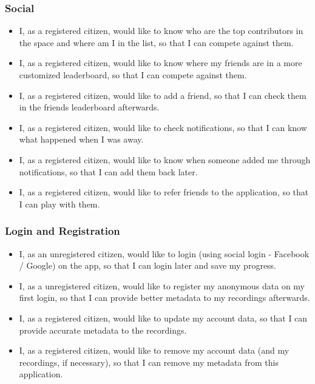 \subsubsection{Social}

\begin{itemize}
    \item I, as a registered citizen, would like to know who are the top contributors in the space and where am I in the list, so that I can compete against them.
    \item I, as a registered citizen, would like to know where my friends are in a more customized leaderboard, so that I can compete against them.
    \item I, as a registered citizen, would like to add a friend, so that I can check them in the friends leaderboard afterwards.
    \item I, as a registered citizen, would like to check notifications, so that I can know what happened when I was away.
    \item I, as a registered citizen, would like to know when someone added me through notifications, so that I can add them back later.
    \item I, as a registered citizen, would like to refer friends to the application, so that I can play with them.
\end{itemize}

\subsubsection{Login and Registration}

\begin{itemize}
    \item I, as an unregistered citizen, would like to login (using social login - Facebook / Google) on the app, so that I can login later and save my progress.
    \item I, as a unregistered citizen, would like to register my anonymous data on my first login, so that I can provide better metadata to my recordings afterwards.
    \item I, as a registered citizen, would like to update my account data, so that I can provide accurate metadata to the recordings.
    \item I, as a registered citizen, would like to remove my account data (and my recordings, if necessary), so that I can remove my metadata from this application.
\end{itemize}

